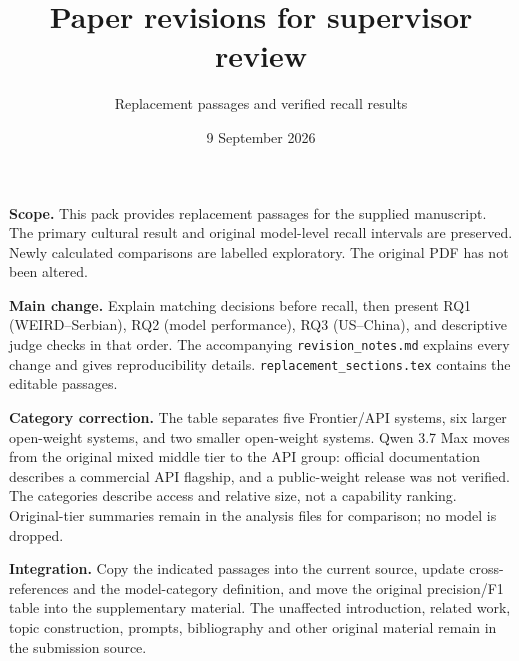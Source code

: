 \documentclass[11pt,a4paper]{article}
\title{Paper revisions for supervisor review}
\author{Replacement passages and verified recall results}
\date{9 September 2026}
\begin{document}
\maketitle
\noindent\textbf{Scope.} This pack provides replacement passages for the
supplied manuscript. The primary cultural result and original model-level
recall intervals are preserved. Newly calculated comparisons are labelled
exploratory. The original PDF has not been altered.

\noindent\textbf{Main change.} Explain matching decisions before recall,
then present RQ1 (WEIRD--Serbian), RQ2 (model performance), RQ3
(US--China), and descriptive judge checks in that order. The accompanying
\texttt{revision\_notes.md} explains every change and gives reproducibility
details. \texttt{replacement\_sections.tex} contains the editable passages.

\noindent\textbf{Category correction.} The table separates five
Frontier/API systems, six larger open-weight systems, and two smaller
open-weight systems. Qwen 3.7 Max moves from the original mixed middle
tier to the API group: official documentation describes a commercial
API flagship, and a public-weight release was not verified. The categories
describe access and relative size, not a capability ranking. Original-tier
summaries remain in the analysis files for comparison; no model is dropped.

\noindent\textbf{Integration.} Copy the indicated passages into the current
source, update cross-references and the model-category definition, and move
the original precision/F1 table into the supplementary material. The
unaffected introduction, related work, topic construction, prompts,
bibliography and other original material remain in the submission source.

\clearpage

\end{document}
